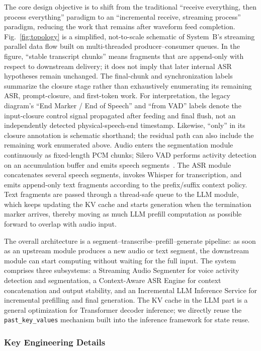 \documentclass[conference]{IEEEtran}
\begin{document}
The core design objective is to shift from the traditional ``receive everything, then process everything'' paradigm to an ``incremental receive, streaming process'' paradigm, reducing the work that remains after waveform feed completion. Fig.~\ref{fig:topology} is a simplified, not-to-scale schematic of System~B's streaming parallel data flow built on multi-threaded producer--consumer queues. In the figure, ``stable transcript chunks'' means fragments that are append-only with respect to downstream delivery; it does not imply that later internal ASR hypotheses remain unchanged. The final-chunk and synchronization labels summarize the closure stage rather than exhaustively enumerating its remaining ASR, prompt-closure, and first-token work. For interpretation, the legacy diagram's ``End Marker / End of Speech'' and ``from VAD'' labels denote the input-closure control signal propagated after feeding and final flush, not an independently detected physical-speech-end timestamp. Likewise, ``only'' in its closure annotation is schematic shorthand; the residual path can also include the remaining work enumerated above. Audio enters the segmentation module continuously as fixed-length PCM chunks; Silero VAD performs activity detection on an accumulation buffer and emits speech segments~\cite{ref13}. The ASR module concatenates several speech segments, invokes Whisper for transcription, and emits append-only text fragments according to the prefix/suffix context policy. Text fragments are passed through a thread-safe queue to the LLM module, which keeps updating the KV cache and starts generation when the termination marker arrives, thereby moving as much LLM prefill computation as possible forward to overlap with audio input.

The overall architecture is a segment--transcribe--prefill--generate pipeline: as soon as an upstream module produces a new audio or text segment, the downstream module can start computing without waiting for the full input. The system comprises three subsystems: a Streaming Audio Segmenter for voice activity detection and segmentation, a Context-Aware ASR Engine for context concatenation and output stability, and an Incremental LLM Inference Service for incremental prefilling and final generation. The KV cache in the LLM part is a general optimization for Transformer decoder inference; we directly reuse the \texttt{past\_key\_values} mechanism built into the inference framework for state reuse.

\subsubsection{Key Engineering Details}
\end{document}
